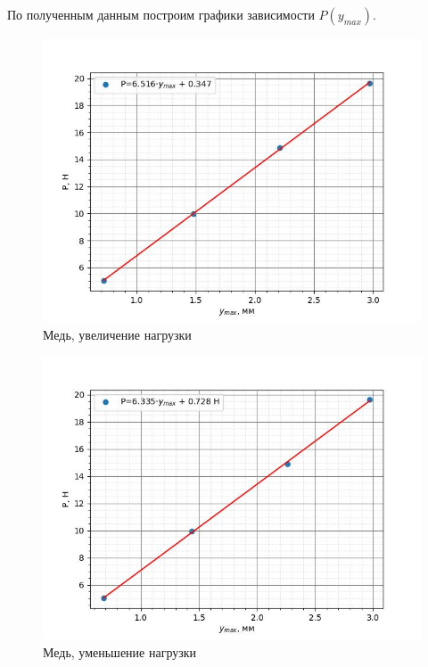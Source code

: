 \documentclass[a4paper,12 pt]{article}
\begin{document}
\begin{enumerate}
    По полученным данным построим графики зависимости $P(y_{max})$.
    \begin{figure}[H]
        \centering
        \includegraphics[scale = 0.7]{CuUp.jpg}
        \caption{Медь, увеличение нагрузки}
    \end{figure}
    \begin{figure}[H]
        \centering
        \includegraphics[scale=0.7]{CuDown.jpg}
        \caption{Медь, уменьшение нагрузки}
    \end{figure}


\end{enumerate}
\end{document}
